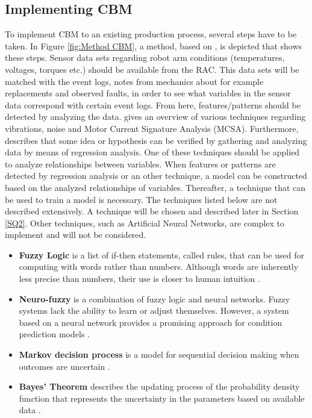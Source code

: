 \subsection{Implementing CBM} \label{Implementing CBM}
To implement CBM to an existing production process, several steps have to be taken. In Figure \ref{fig:Method CBM}, a method, based on \citet{maxgrip}, is depicted that shows these steps. Sensor data sets regarding robot arm conditions (temperatures, voltages, torques etc.) should be available from the RAC. This data sets will be matched with the event logs, notes from mechanics about for example replacements and observed faults, in order to see what variables in the sensor data correspond with certain event logs. From here, features/patterns should be detected by analyzing the data. \citet{Jaber2017} gives an overview of various techniques regarding vibrations, noise and Motor Current Signature Analysis (MCSA). Furthermore, \citet{Kahane2007} describes that some idea or hypothesis can be verified by gathering and analyzing data by means of regression analysis. One of these techniques should be applied to analyze relationships between variables. When features or patterns are detected by regression analysis or an other technique, a model can be constructed based on the analyzed relationships of variables. Thereafter, a technique that can be used to train a model is necessary. The techniques listed below are not described extensively. A technique will be chosen and described later in Section \ref{SQ2}. Other techniques, such as Artificial Neural Networks, are complex to implement and will not be considered.
\begin{itemize}
\item \textbf{Fuzzy Logic} is a list of if-then statements, called rules, that can be used for computing with words rather than numbers. Although words are inherently less precise than numbers, their use is closer to human intuition \parencite{FuzzyToolbox}.
\item \textbf{Neuro-fuzzy} is a combination of fuzzy logic and neural networks. Fuzzy systems lack the ability to learn or adjust themselves. However, a system based on a neural network provides a promising approach for condition prediction models \parencite{Zhao2009}.
\item \textbf{Markov decision process} is a model for sequential decision making when outcomes are uncertain \parencite{DeJonge2017}.
\item \textbf{Bayes' Theorem} describes the updating process of the probability density function that represents the uncertainty in the parameters based on available data \parencite{canavos1973}.
\end{itemize}
